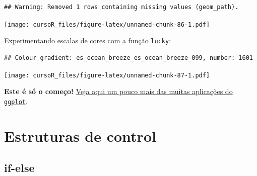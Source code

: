 \documentclass[]{book}
\newenvironment{Shaded}{\begin{snugshade}}{\end{snugshade}}
\newcommand{\KeywordTok}[1]{\textcolor[rgb]{0.13,0.29,0.53}{\textbf{#1}}}
\newcommand{\DataTypeTok}[1]{\textcolor[rgb]{0.13,0.29,0.53}{#1}}
\newcommand{\DecValTok}[1]{\textcolor[rgb]{0.00,0.00,0.81}{#1}}
\newcommand{\StringTok}[1]{\textcolor[rgb]{0.31,0.60,0.02}{#1}}
\newcommand{\OperatorTok}[1]{\textcolor[rgb]{0.81,0.36,0.00}{\textbf{#1}}}
\newcommand{\NormalTok}[1]{#1}
\begin{document}
\begin{verbatim}
## Warning: Removed 1 rows containing missing values (geom_path).
\end{verbatim}

\texttt{[image: cursoR\_files/figure-latex/unnamed-chunk-86-1.pdf]}

Experimentando escalas de cores com a função \texttt{lucky}:

\begin{Shaded}
\end{Shaded}

\begin{verbatim}
## Colour gradient: es_ocean_breeze_es_ocean_breeze_099, number: 1601
\end{verbatim}

\texttt{[image: cursoR\_files/figure-latex/unnamed-chunk-87-1.pdf]}

\textbf{Este é só o começo!}
\href{http://r-statistics.co/Top50-Ggplot2-Visualizations-MasterList-R-Code.html}{Veja
aqui um pouco mais das muitas aplicações do \texttt{ggplot}}.

\chapter{Estruturas de control}\label{loop}

\section{if-else}\label{if-else}
\end{document}
